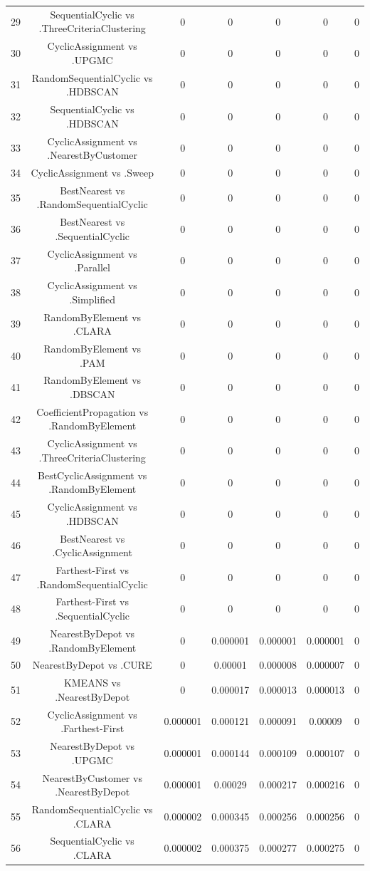 \documentclass[a4paper,10pt]{article}
\begin{document}
\begin{landscape}
\begin{table}[!htp]
\begin{tabular}{ccccccc}
29&SequentialCyclic vs .ThreeCriteriaClustering&0&0&0&0&0\\
30&CyclicAssignment vs .UPGMC&0&0&0&0&0\\
31&RandomSequentialCyclic vs .HDBSCAN&0&0&0&0&0\\
32&SequentialCyclic vs .HDBSCAN&0&0&0&0&0\\
33&CyclicAssignment vs .NearestByCustomer&0&0&0&0&0\\
34&CyclicAssignment vs .Sweep&0&0&0&0&0\\
35&BestNearest vs .RandomSequentialCyclic&0&0&0&0&0\\
36&BestNearest vs .SequentialCyclic&0&0&0&0&0\\
37&CyclicAssignment vs .Parallel&0&0&0&0&0\\
38&CyclicAssignment vs .Simplified&0&0&0&0&0\\
39&RandomByElement vs .CLARA&0&0&0&0&0\\
40&RandomByElement vs .PAM&0&0&0&0&0\\
41&RandomByElement vs .DBSCAN&0&0&0&0&0\\
42&CoefficientPropagation vs .RandomByElement&0&0&0&0&0\\
43&CyclicAssignment vs .ThreeCriteriaClustering&0&0&0&0&0\\
44&BestCyclicAssignment vs .RandomByElement&0&0&0&0&0\\
45&CyclicAssignment vs .HDBSCAN&0&0&0&0&0\\
46&BestNearest vs .CyclicAssignment&0&0&0&0&0\\
47&Farthest-First vs .RandomSequentialCyclic&0&0&0&0&0\\
48&Farthest-First vs .SequentialCyclic&0&0&0&0&0\\
49&NearestByDepot vs .RandomByElement&0&0.000001&0.000001&0.000001&0\\
50&NearestByDepot vs .CURE&0&0.00001&0.000008&0.000007&0\\
51&KMEANS vs .NearestByDepot&0&0.000017&0.000013&0.000013&0\\
52&CyclicAssignment vs .Farthest-First&0.000001&0.000121&0.000091&0.00009&0\\
53&NearestByDepot vs .UPGMC&0.000001&0.000144&0.000109&0.000107&0\\
54&NearestByCustomer vs .NearestByDepot&0.000001&0.00029&0.000217&0.000216&0\\
55&RandomSequentialCyclic vs .CLARA&0.000002&0.000345&0.000256&0.000256&0\\
56&SequentialCyclic vs .CLARA&0.000002&0.000375&0.000277&0.000275&0\\

\end{tabular}
\end{table}
\end{landscape}
\end{document}

